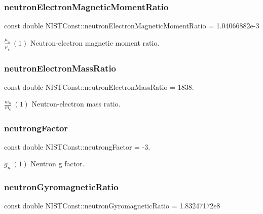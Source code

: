 \subsubsection{\texorpdfstring{neutron\+Electron\+Magnetic\+Moment\+Ratio}{neutronElectronMagneticMomentRatio}}
{\footnotesize\ttfamily const double N\+I\+S\+T\+Const\+::neutron\+Electron\+Magnetic\+Moment\+Ratio = 1.\+04066882e-\/3}

$\frac{\mu_n}{\mu_e} \ (1)$ Neutron-\/electron magnetic moment ratio. \mbox{\label{group___n_i_s_t_const-_neutron_gab348dce51150510468de9d4aa9dece17}} 
\subsubsection{\texorpdfstring{neutron\+Electron\+Mass\+Ratio}{neutronElectronMassRatio}}
{\footnotesize\ttfamily const double N\+I\+S\+T\+Const\+::neutron\+Electron\+Mass\+Ratio = 1838.}

$\frac{m_n}{m_e} \ (1)$ Neutron-\/electron mass ratio. \mbox{\label{group___n_i_s_t_const-_neutron_gac96a82ff7cb2cf20cb9cfe754756c08e}} 
\subsubsection{\texorpdfstring{neutrong\+Factor}{neutrongFactor}}
{\footnotesize\ttfamily const double N\+I\+S\+T\+Const\+::neutrong\+Factor = -\/3.}

$g_n \ (1)$ Neutron g factor. \mbox{\label{group___n_i_s_t_const-_neutron_gaa36e892cf37340a9122574e4a957570d}} 
\subsubsection{\texorpdfstring{neutron\+Gyromagnetic\+Ratio}{neutronGyromagneticRatio}}
{\footnotesize\ttfamily const double N\+I\+S\+T\+Const\+::neutron\+Gyromagnetic\+Ratio = 1.\+83247172e8}

